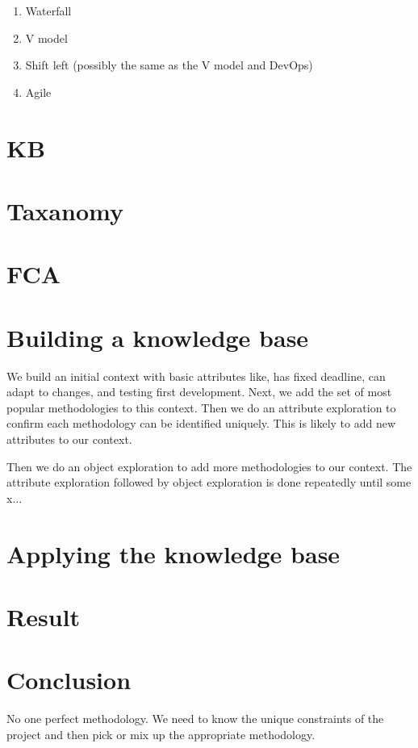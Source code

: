 \documentclass{article}
\begin{document}
\begin{enumerate}
  \item Waterfall
  \item V model
  \item Shift left (possibly the same as the V model and DevOps)
  \item Agile
\end{enumerate}

\section{KB}
\section{Taxanomy}
\section{FCA}

\section{Building a knowledge base}
We build an initial context with basic attributes like, has fixed deadline, can adapt to changes, and testing first development.
Next, we add the set of most popular methodologies to this context.
Then we do an attribute exploration to confirm each methodology can be identified uniquely.
This is likely to add new attributes to our context.

Then we do an object exploration to add more methodologies to our context.
The attribute exploration followed by object exploration is done repeatedly until some x...

\section{Applying the knowledge base}

\section{Result}
\section{Conclusion}
No one perfect methodology.
We need to know the unique constraints of the project and then pick or mix up the appropriate methodology.

\printbibliography
\end{document}
